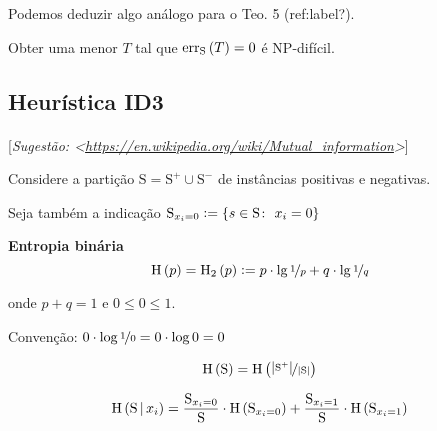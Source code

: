 Podemos deduzir algo análogo para o Teo. 5 (ref:label?).

\begin{fato}
  Obter uma menor $T$ tal que $\mathrm{err}_\mathrm{S}\left(T\vphantom{1j}\right)=0$ é NP-difícil.
\end{fato}

\clearpage
\subsection{Heurística ID3}

\paragraph{\nopunct}[\textit{Sugestão: <\href{https://en.wikipedia.org/wiki/Mutual\_information}{https://en.wikipedia.org/wiki/Mutual\_information}>}]

Considere a partição $\mathrm{S}=\mathrm{S}^+\cup\mathrm{S}^-$ de instâncias positivas e negativas.

Seja também a indicação $\mathrm{S}_{x_i=0}\vcentcolon=\left\{s\in \mathrm{S}\colon\ x_i=0\vphantom{1j}\right\}$

\begin{definicao}
  \normalfont
  \textbf{Entropia binária}
  \[
    \mathrm{H}\left(p\vphantom{1j}\right) = \mathrm{H}_2\left(p\vphantom{1j}\right) \vcentcolon= p\cdot\lg\nicefrac{1}{p} + q\cdot\lg\nicefrac{1}{q}
  \]

  onde $p+q=1$ e $0\leq 0\leq1$.

  Convenção: $0\cdot\log\nicefrac{1}{0}=0\cdot\log0=0$
\end{definicao}

\[
  \mathrm{H}\left(\mathrm{S}\vphantom{1j}\right) = \mathrm{H}\left(\nicefrac{\left|\mathrm{S}^+\vphantom{1j}\right|}{\left|\mathrm{S}\vphantom{1j}\right|}\vphantom{1j}\right)
\]

\[
  \mathrm{H}\left(\mathrm{S}\,\middle|\, x_i\vphantom{1j}\right) = \frac{\mathrm{S}_{x_i=0}}{\mathrm{S}}\cdot\mathrm{H}\left(\mathrm{S}_{x_i=0}\vphantom{1j}\right) + \frac{\mathrm{S}_{x_i=1}}{\mathrm{S}}\cdot\mathrm{H}\left(\mathrm{S}_{x_i=1}\vphantom{1j}\right)
\]

